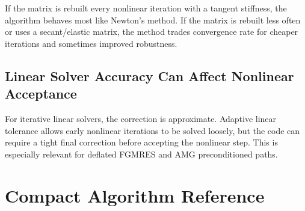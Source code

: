 \documentclass[11pt,a4paper]{article}
\begin{document}
If the matrix is rebuilt every nonlinear iteration with a tangent stiffness, the
algorithm behaves most like Newton's method.  If the matrix is rebuilt less
often or uses a secant/elastic matrix, the method trades convergence rate for
cheaper iterations and sometimes improved robustness.

\subsection{Linear Solver Accuracy Can Affect Nonlinear Acceptance}

For iterative linear solvers, the correction is approximate.  Adaptive linear
tolerance allows early nonlinear iterations to be solved loosely, but the code
can require a tight final correction before accepting the nonlinear step.  This
is especially relevant for deflated FGMRES and AMG preconditioned paths.

\section{Compact Algorithm Reference}
\end{document}
